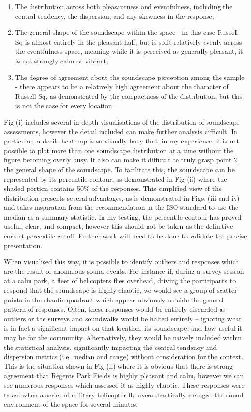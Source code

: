 \begin{enumerate}
  \item The distribution across both pleasantness and eventfulness, including the central tendency, the dispersion, and any skewness in the response;
  \item The general shape of the soundscape within the space - in this case Russell Sq is almost entirely in the pleasant half, but is split relatively evenly across the eventfulness space, meaning while it is perceived as generally pleasant, it is not strongly calm or vibrant;
  \item The degree of agreement about the soundscape perception among the sample - there appears to be a relatively high agreement about the character of Russell Sq, as demonstrated by the compactness of the distribution, but this is not the case for every location.
\end{enumerate}

Fig (i) includes several in-depth visualisations of the distribution of soundscape assessments, however the detail included can make further analysis difficult. In particular, a decile heatmap is so visually busy that, in my experience, it is not possible to plot more than one soundscape distribution at a time without the figure becoming overly busy. It also can make it difficult to truly grasp point 2, the general shape of the soundscape. To facilitate this, the soundscape can be represented by its  percentile contour, as demonstrated in Fig (ii) where the shaded portion contains 50\% of the responses. This simplified view of the distribution presents several advantages, as is demonstrated in Figs. (iii and iv) and takes inspiration from the recommendation in the ISO standard to use the median as a summary statistic. In my testing, the  percentile contour has proved useful, clear, and compact, however this should not be taken as the definitive correct percentile cutoff. Further work will need to be done to validate the precise presentation.

When visualised this way, it is possible to identify outliers and responses which are the result of anomalous sound events. For instance if, during a survey session at a calm park, a fleet of helicopters flies overhead, driving the participants to respond that the soundscape is highly chaotic, we would see a group of scatter points in the chaotic quadrant which appear obviously outside the general pattern of responses. Often, these responses would be entirely discarded as outliers or the surveys and soundwalks would be halted entirely -- ignoring what is in fact a significant impact on that location, its soundscape, and how useful it may be for the community. Alternatively, they would be naively included within the statistical analysis, significantly impacting the central tendency and dispersion metrics (i.e. median and range) without consideration for the context. This is the situation shown in Fig (ii) where it is obvious that there is strong agreement that Regents Park Fields is highly pleasant and calm, however we can see numerous responses which assessed it as highly chaotic. These responses were taken when a series of military helicopter fly overs drastically changed the sound environment of the space for several minutes.

